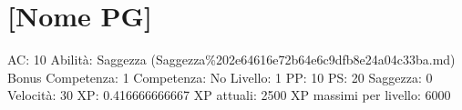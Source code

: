\section{{[}Nome PG{]}}\label{nome-pg}

AC: 10 Abilità: Saggezza
(Saggezza\%202e64616e72b64e6c9dfb8e24a04c33ba.md) Bonus Competenza: 1
Competenza: No Livello: 1 PP: 10 PS: 20 Saggezza: 0 Velocità: 30 XP:
0.416666666667 XP attuali: 2500 XP massimi per livello: 6000
